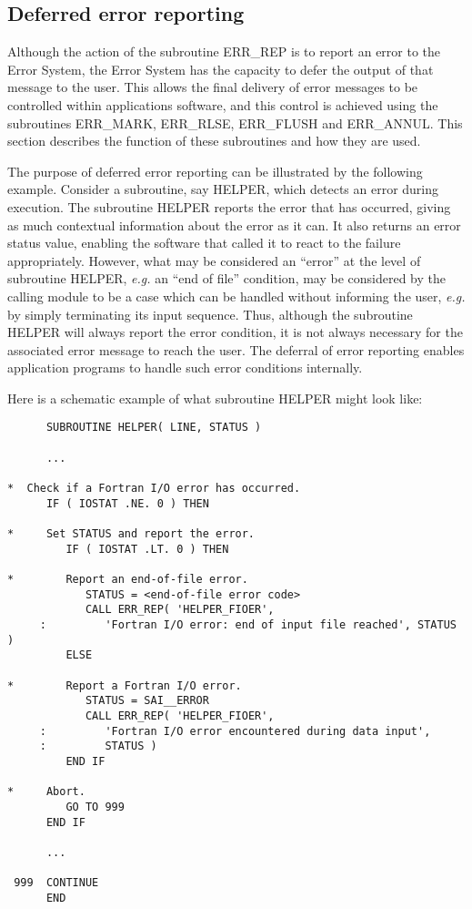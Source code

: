 \subsection {Deferred error reporting} \label{errdef_sect}

Although the action of the subroutine ERR\_REP is to report an error to the 
Error System, the Error System has the capacity to defer the output of
that message to the user.
This allows the final delivery of error messages to be controlled within
applications software, and this control is achieved using the subroutines
ERR\_MARK, ERR\_RLSE, ERR\_FLUSH and ERR\_ANNUL. 
This section describes the function of these subroutines and how they are
used.

The purpose of deferred error reporting can be illustrated by the following
example.
Consider a subroutine, say HELPER, which detects an error during execution. 
The subroutine HELPER reports the error that has occurred, giving as much
contextual information about the error as it can.
It also returns an error status value, enabling the software that called it
to react to the failure appropriately. 
However, what may be considered an ``error'' at the level of subroutine
HELPER, {\em e.g.} an ``end of file'' condition, may be considered by the
calling module to be a case which can be handled without informing the user,
{\em e.g.} by simply terminating its input sequence. 
Thus, although the subroutine HELPER will always report the error condition,
it is not always necessary for the associated error message to reach the
user. 
The deferral of error reporting enables application programs to handle such 
error conditions internally.

Here is a schematic example of what subroutine HELPER might look like:

\begin {small}
\begin{verbatim}
      SUBROUTINE HELPER( LINE, STATUS )

      ...

*  Check if a Fortran I/O error has occurred.
      IF ( IOSTAT .NE. 0 ) THEN

*     Set STATUS and report the error.
         IF ( IOSTAT .LT. 0 ) THEN

*        Report an end-of-file error.
            STATUS = <end-of-file error code>
            CALL ERR_REP( 'HELPER_FIOER', 
     :         'Fortran I/O error: end of input file reached', STATUS )
         ELSE

*        Report a Fortran I/O error.
            STATUS = SAI__ERROR
            CALL ERR_REP( 'HELPER_FIOER', 
     :         'Fortran I/O error encountered during data input',
     :         STATUS )
         END IF

*     Abort.
         GO TO 999
      END IF

      ...

 999  CONTINUE
      END
\end{verbatim}
\end {small}

